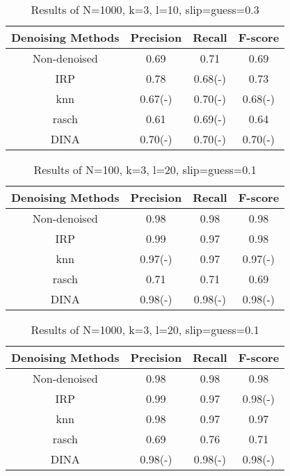 \documentclass[11pt]{article}
\begin{document}
\begin{table}[!h]
\begin{center}
\begin{tabular}{|c|c|c|c|}
\hline
Denoising Methods & Precision & Recall & F-score\\
\hline
Non-denoised & 0.69 & 0.71 & 0.69  \\
\hline
IRP & 0.78 & 0.68(-) & 0.73 \\
\hline
knn & 0.67(-) & 0.70(-) & 0.68(-) \\
\hline
rasch & 0.61 & 0.69(-) & 0.64 \\
\hline
DINA & 0.70(-) & 0.70(-) & 0.70(-) \\
\hline
\end{tabular}
\end{center}
\caption{Results of N=1000, k=3, l=10, slip=guess=0.3}\label{tab:results6}
\end{table}


\begin{table}[!h]
\begin{center}
\begin{tabular}{|c|c|c|c|}
\hline
Denoising Methods & Precision & Recall & F-score\\
\hline
Non-denoised & 0.98 & 0.98 & 0.98  \\
\hline
IRP & 0.99 & 0.97 & 0.98 \\
\hline
knn & 0.97(-) & 0.97 & 0.97(-) \\
\hline
rasch & 0.71 & 0.71 & 0.69 \\
\hline
DINA & 0.98(-) & 0.98(-) & 0.98(-) \\
\hline
\end{tabular}
\end{center}
\caption{Results of N=100, k=3, l=20, slip=guess=0.1}\label{tab:results7}
\end{table}


\begin{table}[!h]
\begin{center}
\begin{tabular}{|c|c|c|c|}
\hline
Denoising Methods & Precision & Recall & F-score\\
\hline
Non-denoised & 0.98 & 0.98 & 0.98  \\
\hline
IRP & 0.99 & 0.97 & 0.98(-) \\
\hline
knn & 0.98 & 0.97 & 0.97 \\
\hline
rasch & 0.69 & 0.76 & 0.71 \\
\hline
DINA & 0.98(-) & 0.98(-) & 0.98(-) \\
\hline
\end{tabular}
\end{center}
\caption{Results of N=1000, k=3, l=20, slip=guess=0.1}\label{tab:results8}
\end{table}
\end{document}
